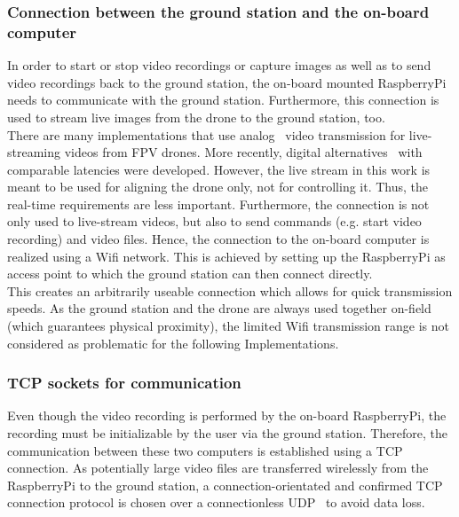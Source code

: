 \subsubsection{Connection between the ground station and the on-board computer}\label{subsubsec:4_pi_wifi}
In order to start or stop video recordings or capture images as well as to
send video recordings back to the ground station, the on-board mounted
RaspberryPi needs to communicate with the ground station.
Furthermore, this connection is used to stream live images from the drone to
the ground station, too.\\
There are many implementations that use
analog~\cite{tecpoyotl-torresRealtimeVideoTransmission2021} video transmission
for live-streaming videos from \ac{FPV} drones.
More recently, digital alternatives~\cite{silicQoEAssessmentFPV2021} with
comparable latencies were developed.
However, the live stream in this work is meant to be used for aligning the
drone only, not for controlling it.
Thus, the real-time requirements are less important.
Furthermore, the connection is not only used to live-stream videos, but also
to send commands (e.g. start video recording) and video files.
Hence, the connection to the on-board computer is realized using a Wifi
network.
This is achieved by setting up the RaspberryPi as access point to which the
ground station can then connect directly.\\
This creates an arbitrarily useable connection which allows for quick
transmission speeds.
As the ground station and the drone are always used together on-field (which
guarantees physical proximity), the limited Wifi transmission range is not
considered as problematic for the following Implementations.

\subsubsection{TCP sockets for communication}\label{subsubsec:4_tcp_sockets}
Even though the video recording is performed by the on-board RaspberryPi, the
recording must be initializable by the user via the ground station.
Therefore, the communication between these two computers is established using
a \ac{TCP}~\cite{cerfProtocolPacketNetwork1974} connection.
As potentially large video files are transferred wirelessly from the
RaspberryPi to the ground station, a connection-orientated and confirmed
\ac{TCP} connection protocol is chosen over a connectionless
\ac{UDP}~\cite{SpecificationInternetTransmission1974} to avoid data loss.\\\\

